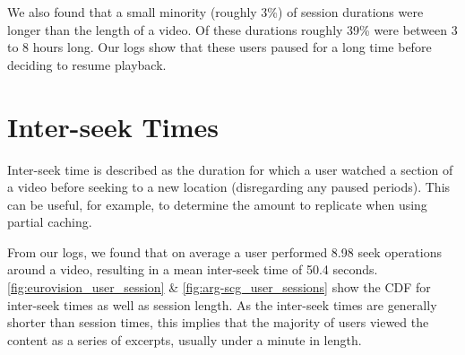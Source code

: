 We also found that a small minority (roughly 3\%) of session durations were longer than the length of a video. Of these durations roughly 39\% were between 3 to 8 hours long. Our logs show that these users paused for a long time before deciding to resume playback.



\section{Inter-seek Times}
\label{sect:interseek}

Inter-seek time is described as the duration for which a user watched a section of a video before seeking to a new location (disregarding any paused periods). This can be useful, for example, to determine the amount to replicate when using partial caching.

From our logs, we found that on average a user performed 8.98 seek operations around a video, resulting in a mean inter-seek time of 50.4 seconds. \autoref{fig:eurovision_user_session} \& \autoref{fig:arg-scg_user_sessions} show the CDF for inter-seek times as well as session length. As the inter-seek times are generally shorter than session times, this implies that the majority of users viewed the content as a series of excerpts, usually under a minute in length.





